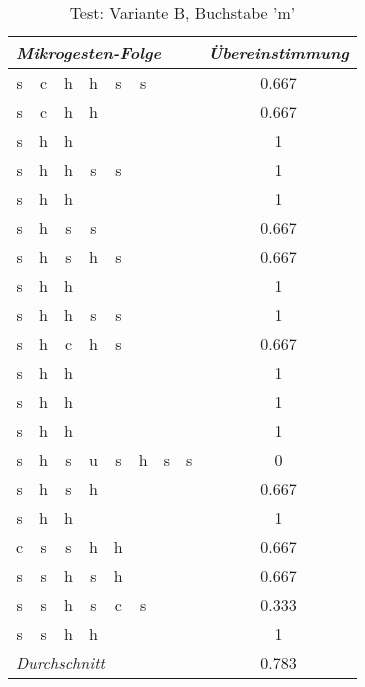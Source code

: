 \begin{table}[!h]
  \begin{center}
    \begin{tabular}{ c c c c c c c c  | c }
\multicolumn{8}{l}{\emph{Mikrogesten-Folge}}&\emph{Übereinstimmung} \\ \hline

s&c&h&h&s&s&&&0.667\\ \hline
s&c&h&h&&&&&0.667\\ \hline
s&h&h&&&&&&1\\ \hline
s&h&h&s&s&&&&1\\ \hline
s&h&h&&&&&&1\\ \hline
s&h&s&s&&&&&0.667\\ \hline
s&h&s&h&s&&&&0.667\\ \hline
s&h&h&&&&&&1\\ \hline
s&h&h&s&s&&&&1\\ \hline
s&h&c&h&s&&&&0.667\\ \hline
s&h&h&&&&&&1\\ \hline
s&h&h&&&&&&1\\ \hline
s&h&h&&&&&&1\\ \hline
s&h&s&u&s&h&s&s&0\\ \hline
s&h&s&h&&&&&0.667\\ \hline
s&h&h&&&&&&1\\ \hline
c&s&s&h&h&&&&0.667\\ \hline
s&s&h&s&h&&&&0.667\\ \hline
s&s&h&s&c&s&&&0.333\\ \hline
s&s&h&h&&&&&1\\ \hline
\multicolumn{8}{l|}{\emph{Durchschnitt}}&  0.783  \\ \hline

    \end{tabular}
  \end{center}
  \caption{Test: Variante B, Buchstabe 'm'}
  \label{test_b_m}
\end{table}
